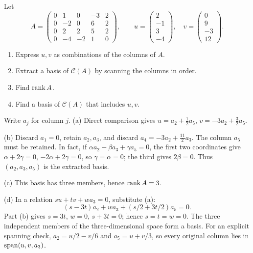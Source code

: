 \begin{problem}\label{ex:03:prescribed-basis}
Let
\[
A=\begin{pmatrix}0&1&0&-3&2\\0&-2&0&6&2\\0&2&2&5&2\\0&-4&-2&1&0\end{pmatrix},\qquad
u=\begin{pmatrix}2\\-1\\3\\-4\end{pmatrix},\quad
v=\begin{pmatrix}0\\9\\-3\\12\end{pmatrix}.
\]
\begin{enumerate}
\item Express \(u,v\) as combinations of the columns of \(A\).
\item Extract a basis of \(\mathcal C(A)\) by scanning the columns in order.
\item Find \(\operatorname{rank} A\).
\item Find a basis of \(\mathcal C(A)\) that includes \(u,v\).
\end{enumerate}
\end{problem}
\begin{solution}
Write \(a_j\) for column \(j\).
(a) Direct comparison gives \(u=a_2+\tfrac12a_5\),
\(v=-3a_2+\tfrac32a_5\).

(b) Discard \(a_1=0\), retain \(a_2,a_3\), and discard
\(a_4=-3a_2+\tfrac{11}{2}a_3\).
The column \(a_5\) must be retained. In fact, if
\(\alpha a_2+\beta a_3+\gamma a_5=0\), the first two coordinates give
\(\alpha+2\gamma=0\), \(-2\alpha+2\gamma=0\), so
\(\gamma=\alpha=0\); the third gives \(2\beta=0\).
Thus \((a_2,a_3,a_5)\) is the extracted basis.

(c) This basis has three members, hence \(\operatorname{rank} A=3\).

(d) In a relation \(su+tv+wa_3=0\), substitute (a):
\[
(s-3t)a_2+w a_3+(s/2+3t/2)a_5=0.
\]
Part (b) gives \(s=3t\), \(w=0\), \(s+3t=0\); hence \(s=t=w=0\).
The three independent members of the three-dimensional space form a basis.
For an explicit spanning check,
\(a_2=u/2-v/6\) and \(a_5=u+v/3\), so every original column lies in
\(\operatorname{span}(u,v,a_3)\).
\end{solution}


